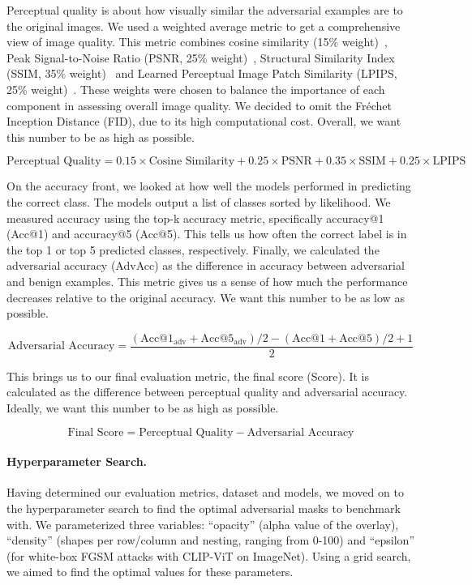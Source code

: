 \documentclass[a4paper, oneside]{discothesis}
\begin{document}
Perceptual quality is about how visually similar the adversarial examples are to the original images. We used a weighted average metric to get a comprehensive view of image quality. This metric combines cosine similarity (15\% weight)~\cite{singhal2001modern}, Peak Signal-to-Noise Ratio (PSNR, 25\% weight)~\cite{9311108}, Structural Similarity Index (SSIM, 35\% weight)~\cite{wang2004image} and Learned Perceptual Image Patch Similarity (LPIPS, 25\% weight)~\cite{lpips}. These weights were chosen to balance the importance of each component in assessing overall image quality. We decided to omit the Fréchet Inception Distance (FID), due to its high computational cost. Overall, we want this number to be as high as possible.

$$
\text{Perceptual Quality} = 0.15 \times \text{Cosine Similarity} + 0.25 \times \text{PSNR} + 0.35 \times \text{SSIM} + 0.25 \times \text{LPIPS}
$$

On the accuracy front, we looked at how well the models performed in predicting the correct class. The models output a list of classes sorted by likelihood. We measured accuracy using the top-k accuracy metric, specifically accuracy@1 (Acc@1) and accuracy@5 (Acc@5). This tells us how often the correct label is in the top 1 or top 5 predicted classes, respectively. Finally, we calculated the adversarial accuracy (AdvAcc) as the difference in accuracy between adversarial and benign examples. This metric gives us a sense of how much the performance decreases relative to the original accuracy. We want this number to be as low as possible.

$$
\text{Adversarial Accuracy} = \frac{(\text{Acc@1}_{\text{adv}} + \text{Acc@5}_{\text{adv}}) / 2 - (\text{Acc@1} + \text{Acc@5}) / 2 + 1}{2}
$$

This brings us to our final evaluation metric, the final score (Score). It is calculated as the difference between perceptual quality and adversarial accuracy. Ideally, we want this number to be as high as possible.

$$
\text{Final Score} = \text{Perceptual Quality} - \text{Adversarial Accuracy}
$$

\paragraph{Hyperparameter Search.}

Having determined our evaluation metrics, dataset and models, we moved on to the hyperparameter search to find the optimal adversarial masks to benchmark with. We parameterized three variables: ``opacity'' (alpha value of the overlay), ``density'' (shapes per row/column and nesting, ranging from 0-100) and ``epsilon'' (for white-box FGSM attacks with CLIP-ViT on ImageNet). Using a grid search, we aimed to find the optimal values for these parameters.
\end{document}
